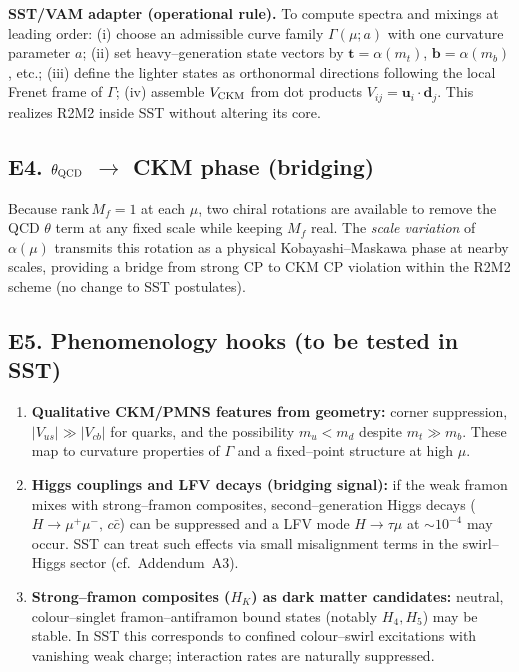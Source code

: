 \documentclass[11pt]{article}
\begin{document}
          \textbf{SST/VAM adapter (operational rule).} To compute spectra and mixings at leading order:
          (i) choose an admissible curve family $\Gamma(\mu;a)$ with one curvature parameter $a$;
          (ii) set heavy–generation state vectors by $\mathbf t=\alpha(m_t)$, $\mathbf b=\alpha(m_b)$, etc.;
          (iii) define the lighter states as orthonormal directions following the local Frenet frame of $\Gamma$;
          (iv) assemble $V_{\rm CKM}$ from dot products $V_{ij}=\mathbf u_i\!\cdot\!\mathbf d_j$.
          This realizes R2M2 inside SST without altering its core.

      \subsection*{E4. $\theta_{\rm QCD}$ $\rightarrow$ CKM phase (bridging)}
          Because $\mathrm{rank}\,M_f=1$ at each $\mu$, two chiral rotations are available to remove the QCD $\theta$ term at any fixed scale while keeping $M_f$ real. The \emph{scale variation} of $\alpha(\mu)$ transmits this rotation as a physical Kobayashi–Maskawa phase at nearby scales, providing a bridge from strong CP to CKM CP violation within the R2M2 scheme (no change to SST postulates).

      \subsection*{E5. Phenomenology hooks (to be tested in SST)}
          \begin{enumerate}
          \item \textbf{Qualitative CKM/PMNS features from geometry:} corner suppression, $|V_{us}|\gg|V_{cb}|$ for quarks, and the possibility $m_u<m_d$ despite $m_t\!\gg\!m_b$. These map to curvature properties of $\Gamma$ and a fixed–point structure at high $\mu$.
          \item \textbf{Higgs couplings and LFV decays (bridging signal):} if the weak framon mixes with strong–framon composites, second–generation Higgs decays ($H\!\to\!\mu^+\mu^-,\,c\bar c$) can be suppressed and a LFV mode $H\!\to\!\tau\mu$ at $\sim 10^{-4}$ may occur. SST can treat such effects via small misalignment terms in the swirl–Higgs sector (cf.\ Addendum~A3).
          \item \textbf{Strong–framon composites ($H_K$) as dark matter candidates:} neutral, colour–singlet framon–antiframon bound states (notably $H_4, H_5$) may be stable. In SST this corresponds to confined colour–swirl excitations with vanishing weak charge; interaction rates are naturally suppressed.
          \end{enumerate}
\end{document}
